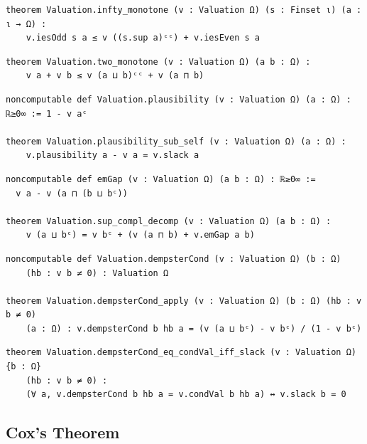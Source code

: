 \label{lean:infty-monotone}
\begin{lstlisting}
theorem Valuation.infty_monotone (v : Valuation Ω) (s : Finset ι) (a : ι → Ω) :
    v.iesOdd s a ≤ v ((s.sup a)ᶜᶜ) + v.iesEven s a
\end{lstlisting}

\label{lean:two-monotone}
\begin{lstlisting}
theorem Valuation.two_monotone (v : Valuation Ω) (a b : Ω) :
    v a + v b ≤ v (a ⊔ b)ᶜᶜ + v (a ⊓ b)
\end{lstlisting}

\label{lean:plausibility-sub-self}
\begin{lstlisting}
noncomputable def Valuation.plausibility (v : Valuation Ω) (a : Ω) : ℝ≥0∞ := 1 - v aᶜ

theorem Valuation.plausibility_sub_self (v : Valuation Ω) (a : Ω) :
    v.plausibility a - v a = v.slack a
\end{lstlisting}

\label{lean:sup-compl-decomp}
\begin{lstlisting}
noncomputable def emGap (v : Valuation Ω) (a b : Ω) : ℝ≥0∞ :=
  v a - v (a ⊓ (b ⊔ bᶜ))

theorem Valuation.sup_compl_decomp (v : Valuation Ω) (a b : Ω) :
    v (a ⊔ bᶜ) = v bᶜ + (v (a ⊓ b) + v.emGap a b)
\end{lstlisting}

\label{lean:dempstercond}
\begin{lstlisting}
noncomputable def Valuation.dempsterCond (v : Valuation Ω) (b : Ω)
    (hb : v b ≠ 0) : Valuation Ω

theorem Valuation.dempsterCond_apply (v : Valuation Ω) (b : Ω) (hb : v b ≠ 0)
    (a : Ω) : v.dempsterCond b hb a = (v (a ⊔ bᶜ) - v bᶜ) / (1 - v bᶜ)
\end{lstlisting}

\label{lean:dempstercond-eq-condval-iff-slack}
\begin{lstlisting}
theorem Valuation.dempsterCond_eq_condVal_iff_slack (v : Valuation Ω) {b : Ω}
    (hb : v b ≠ 0) :
    (∀ a, v.dempsterCond b hb a = v.condVal b hb a) ↔ v.slack b = 0
\end{lstlisting}

\subsection{Cox's Theorem}

